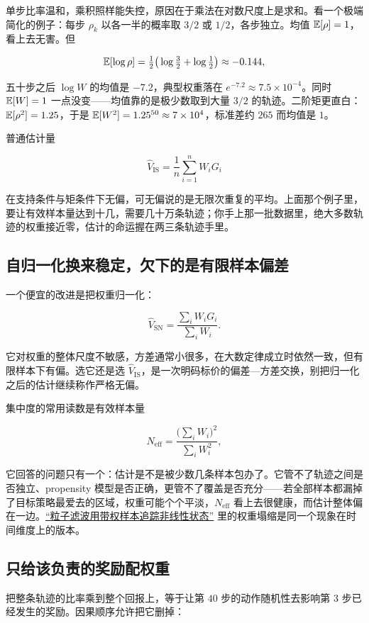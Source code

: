 单步比率温和，乘积照样能失控，原因在于乘法在对数尺度上是求和。看一个极端简化的例子：每步 \(\rho_k\) 以各一半的概率取 \(3/2\) 或 \(1/2\)，各步独立。均值 \(\mathbb{E}[\rho]=1\)，看上去无害。但

\[
\mathbb{E}[\log\rho]=\tfrac12\big(\log\tfrac32+\log\tfrac12\big)\approx-0.144,
\]

五十步之后 \(\log W\) 的均值是 \(-7.2\)，典型权重落在 \(e^{-7.2}\approx7.5\times10^{-4}\)。同时 \(\mathbb{E}[W]=1\) 一点没变——均值靠的是极少数取到大量 \(3/2\) 的轨迹。二阶矩更直白：\(\mathbb{E}[\rho^2]=1.25\)，于是 \(\mathbb{E}[W^2]=1.25^{50}\approx7\times10^{4}\)，标准差约 \(265\) 而均值是 \(1\)。

普通估计量

\[
\widehat V_{\mathrm{IS}}=\frac1n\sum_{i=1}^{n}W_iG_i
\]

在支持条件与矩条件下无偏，可无偏说的是无限次重复的平均。上面那个例子里，要让有效样本量达到十几，需要几十万条轨迹；你手上那一批数据里，绝大多数轨迹的权重接近零，估计的命运握在两三条轨迹手里。

\subsection{自归一化换来稳定，欠下的是有限样本偏差}

一个便宜的改进是把权重归一化：

\[
\widehat V_{\mathrm{SN}}=\frac{\sum_iW_iG_i}{\sum_iW_i}.
\]

它对权重的整体尺度不敏感，方差通常小很多，在大数定律成立时依然一致，但有限样本下有偏。选它还是选 \(\widehat V_{\mathrm{IS}}\)，是一次明码标价的偏差---方差交换，别把归一化之后的估计继续称作严格无偏。

集中度的常用读数是有效样本量

\[
N_{\mathrm{eff}}=\frac{\big(\sum_iW_i\big)^2}{\sum_iW_i^{2}},
\]

它回答的问题只有一个：估计是不是被少数几条样本包办了。它管不了轨迹之间是否独立、propensity 模型是否正确，更管不了覆盖是否充分——若全部样本都漏掉了目标策略最爱去的区域，权重可能个个平淡，\(N_{\mathrm{eff}}\) 看上去很健康，而估计整体偏在一边。\hyperref[sec:13-Machine-Learning/08-Sampling-and-Inference/05]{``粒子滤波用带权样本追踪非线性状态''} 里的权重塌缩是同一个现象在时间维度上的版本。

\subsection{只给该负责的奖励配权重}

把整条轨迹的比率乘到整个回报上，等于让第 \(40\) 步的动作随机性去影响第 \(3\) 步已经发生的奖励。因果顺序允许把它删掉：

